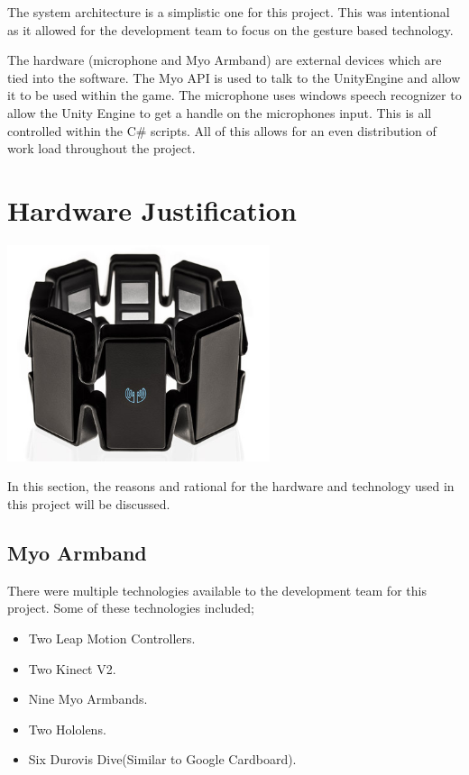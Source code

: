 \documentclass{article}
\begin{document}
\bigskip
The system architecture is a simplistic one for this project. This was intentional as it allowed for the development team to focus on the gesture based technology.

\bigskip

The hardware (microphone and Myo Armband) are external devices which are tied into the software. The Myo API is used to talk to the UnityEngine and allow it to be used within the game. The microphone uses windows speech recognizer to allow the Unity Engine to get a handle on the microphones input. This is all controlled within the C\# scripts. All of this allows for an even distribution of work load throughout the project.

\section{Hardware Justification}
\includegraphics[width=\textwidth, height=180pt]{img/Hardware.jpg}

\bigskip

In this section, the reasons and rational for the hardware and technology used in this project will be discussed. 

\subsection{Myo Armband}
There were multiple technologies available to the development team for this project. Some of these technologies included;

\begin{itemize}
    \item Two Leap Motion Controllers.
    \item Two Kinect V2.
    \item Nine Myo Armbands.
    \item Two Hololens.
    \item Six Durovis Dive(Similar to Google Cardboard).
\end{itemize}
\end{document}
